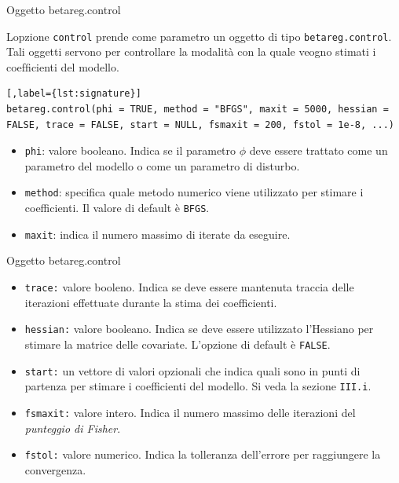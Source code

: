 \documentclass[usenames,dvipsnames]{beamer}
\begin{document}
\begin{frame}{Oggetto betareg.control}

Lopzione \texttt{control} prende come parametro un oggetto di tipo \texttt{betareg.control}. Tali oggetti servono per controllare la modalità con la quale veogno stimati i coefﬁcienti del modello.
\begin{lstlisting}[,label={lst:signature}]
betareg.control(phi = TRUE, method = "BFGS", maxit = 5000, hessian = FALSE, trace = FALSE, start = NULL, fsmaxit = 200, fstol = 1e-8, ...)
\end{lstlisting}
\begin{itemize}
	\item \texttt{phi}: valore booleano. Indica se il parametro $\phi$ deve essere trattato come un parametro del modello o come un parametro di disturbo.
	\item \texttt{method}: specifica quale metodo numerico viene utilizzato per stimare i coefficienti. Il valore di default è \texttt{BFGS}.
	\item \texttt{maxit}: indica il numero massimo di iterate da eseguire.
\end{itemize}
\end{frame}



\begin{frame}{Oggetto betareg.control}

\begin{itemize}
		\item \texttt{trace:} valore booleno. Indica se deve essere mantenuta traccia delle iterazioni effettuate durante la stima dei coefficienti.
		\item \texttt{hessian:} valore booleano. Indica se deve essere utilizzato l'Hessiano per stimare la matrice delle covariate. L'opzione di default è \texttt{FALSE}.
		\item \texttt{start:} un vettore di valori opzionali che indica quali sono in punti di partenza per stimare i coefficienti del modello. Si veda la sezione \texttt{III.i}.
		\item \texttt{fsmaxit:} valore intero. Indica il numero massimo delle iterazioni del \textit{punteggio di Fisher}.
		\item \texttt{fstol:} valore numerico. Indica la tolleranza dell'errore per raggiungere la convergenza.
	\end{itemize}
	
\end{frame}
\end{document}
